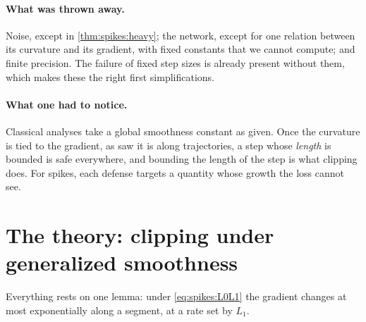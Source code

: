 \begin{refsection}
\paragraph{What was thrown away.} Noise, except in \cref{thm:spikes:heavy}; the network, except for one relation between its curvature and its gradient, with fixed constants that we cannot compute; and finite precision. The failure of fixed step sizes is already present without them, which makes these the right first simplifications.

\paragraph{What one had to notice.} Classical analyses take a global smoothness constant as given. Once the curvature is tied to the gradient, as \textcite{ZhangHeSraJadbabaie2020} saw it is along trajectories, a step whose \emph{length} is bounded is safe everywhere, and bounding the length of the step is what clipping does. For spikes, each defense targets a quantity whose growth the loss cannot see.

\section{The theory: clipping under generalized smoothness}\label{sec:spikes:clipping}

Everything rests on one lemma: under \eqref{eq:spikes:L0L1} the gradient changes at most exponentially along a segment, at a rate set by $L_1$.



\end{refsection}
